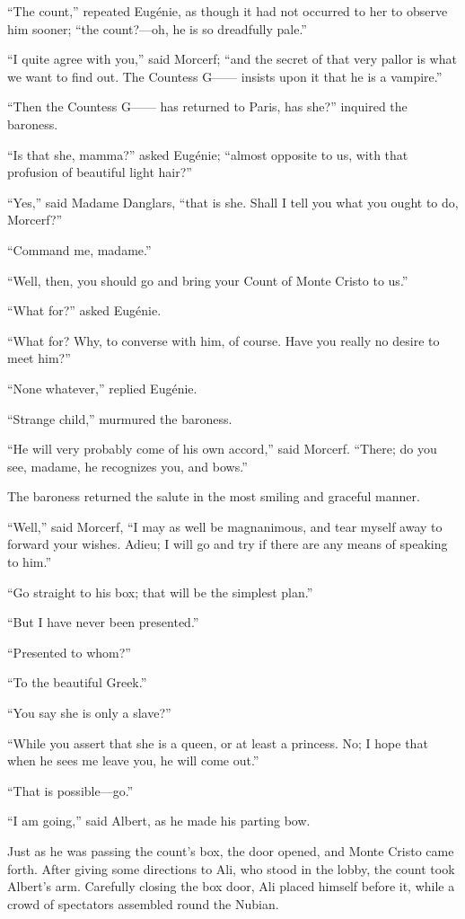 “The count,” repeated Eugénie, as though it had not occurred to her to
observe him sooner; “the count?—oh, he is so dreadfully pale.”

“I quite agree with you,” said Morcerf; “and the secret of that very
pallor is what we want to find out. The Countess G—— insists upon it
that he is a vampire.”

“Then the Countess G—— has returned to Paris, has she?” inquired the
baroness.

“Is that she, mamma?” asked Eugénie; “almost opposite to us, with that
profusion of beautiful light hair?”

“Yes,” said Madame Danglars, “that is she. Shall I tell you what you
ought to do, Morcerf?”

“Command me, madame.”

“Well, then, you should go and bring your Count of Monte Cristo to us.”

“What for?” asked Eugénie.

“What for? Why, to converse with him, of course. Have you really no
desire to meet him?”

“None whatever,” replied Eugénie.

“Strange child,” murmured the baroness.

“He will very probably come of his own accord,” said Morcerf. “There;
do you see, madame, he recognizes you, and bows.”

The baroness returned the salute in the most smiling and graceful
manner.

“Well,” said Morcerf, “I may as well be magnanimous, and tear myself
away to forward your wishes. Adieu; I will go and try if there are any
means of speaking to him.”

“Go straight to his box; that will be the simplest plan.”

“But I have never been presented.”

“Presented to whom?”

“To the beautiful Greek.”

“You say she is only a slave?”

“While you assert that she is a queen, or at least a princess. No; I
hope that when he sees me leave you, he will come out.”

“That is possible—go.”

“I am going,” said Albert, as he made his parting bow.

Just as he was passing the count’s box, the door opened, and Monte
Cristo came forth. After giving some directions to Ali, who stood in
the lobby, the count took Albert’s arm. Carefully closing the box door,
Ali placed himself before it, while a crowd of spectators assembled
round the Nubian.

